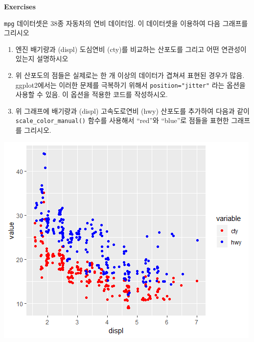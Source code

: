 \documentclass[
]{book}
\newenvironment{Shaded}{\begin{snugshade}}{\end{snugshade}}
\newcommand{\AttributeTok}[1]{\textcolor[rgb]{0.77,0.63,0.00}{#1}}
\newcommand{\FunctionTok}[1]{\textcolor[rgb]{0.00,0.00,0.00}{#1}}
\newcommand{\NormalTok}[1]{#1}
\newcommand{\OtherTok}[1]{\textcolor[rgb]{0.56,0.35,0.01}{#1}}
\newcommand{\SpecialCharTok}[1]{\textcolor[rgb]{0.00,0.00,0.00}{#1}}
\newcommand{\StringTok}[1]{\textcolor[rgb]{0.31,0.60,0.02}{#1}}
\begin{document}
\textbf{Exercises}

\texttt{mpg} 데이터셋은 38종 자동차의 연비 데이터임. 이 데이터셋을 이용하여 다음 그래프를 그리시오

\begin{enumerate}
\def\labelenumi{\arabic{enumi})}
\item
  엔진 배기량과 (displ) 도심연비 (cty)를 비교하는 산포도를 그리고 어떤 연관성이 있는지 설명하시오
\item
  위 산포도의 점들은 실제로는 한 개 이상의 데이터가 겹쳐셔 표현된 경우가 많음. ggplot2에서는 이러한 문제를 극복하기 위해서 \texttt{position="jitter"} 라는 옵션을 사용할 수 있음. 이 옵션을 적용한 코드를 작성하시오.
\item
  위 그래프에 배기량과 (displ) 고속도로연비 (hwy) 산포도를 추가하여 다음과 같이 \texttt{scale\_color\_manual()} 함수를 사용해서 ``red''와 ``blue''로 점들을 표현한 그래프를 그리시오.
\end{enumerate}

\begin{Shaded}
\end{Shaded}

\includegraphics{images/06/ex6-4-2.png}
\end{document}
